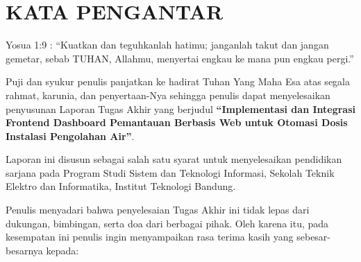 \chapter*{KATA PENGANTAR}
    Yosua 1:9 : 
    ``Kuatkan dan teguhkanlah hatimu; janganlah takut dan jangan gemetar, sebab TUHAN, Allahmu, menyertai engkau ke mana pun engkau pergi.''


Puji dan syukur penulis panjatkan ke hadirat Tuhan Yang Maha Esa atas segala rahmat, karunia, dan penyertaan-Nya sehingga penulis dapat menyelesaikan penyusunan Laporan Tugas Akhir yang berjudul \textbf{``Implementasi dan Integrasi Frontend Dashboard Pemantauan Berbasis Web untuk Otomasi Dosis Instalasi Pengolahan Air''}. 

Laporan ini disusun sebagai salah satu syarat untuk menyelesaikan pendidikan sarjana pada Program Studi Sistem dan Teknologi Informasi, Sekolah Teknik Elektro dan Informatika, Institut Teknologi Bandung.

Penulis menyadari bahwa penyelesaian Tugas Akhir ini tidak lepas dari dukungan, bimbingan, serta doa dari berbagai pihak. Oleh karena itu, pada kesempatan ini penulis ingin menyampaikan rasa terima kasih yang sebesar-besarnya kepada:


